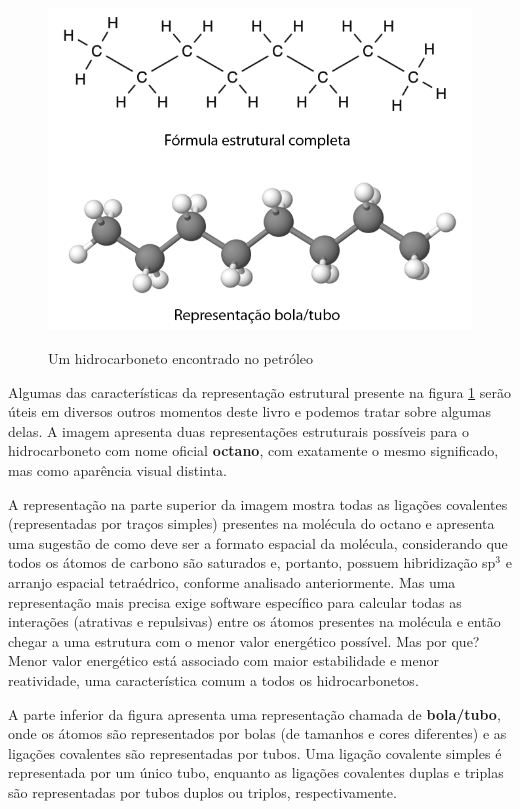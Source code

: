 \documentclass[a4paper,12pt]{book}
\begin{document}
\begin{figure}[H]\centering
\caption{Um hidrocarboneto encontrado no petróleo}
\includegraphics[scale=0.5]{imagens/octano.png}
\label{fig:ocatene}\vspace{0.5cm}\end{figure}

Algumas das características da representação estrutural presente na figura \ref{fig:ocatene} serão úteis em diversos outros momentos deste livro e podemos tratar sobre algumas delas. A imagem apresenta duas representações estruturais possíveis para o hidrocarboneto com nome oficial \textbf{octano}, com exatamente o mesmo significado, mas como aparência visual distinta. 

A representação na parte superior da imagem mostra todas as ligações covalentes (representadas por traços simples) presentes na molécula do octano e apresenta uma sugestão de como deve ser a formato espacial da molécula, considerando que todos os átomos de carbono são saturados e, portanto, possuem hibridização sp$^3$ e arranjo espacial tetraédrico, conforme analisado anteriormente. Mas uma representação mais precisa exige software específico para calcular todas as interações (atrativas e repulsivas) entre os átomos presentes na molécula e então chegar a uma estrutura com o menor valor energético possível. Mas por que? Menor valor energético está associado com maior estabilidade e menor reatividade, uma característica comum a todos os hidrocarbonetos.

A parte inferior da figura apresenta uma representação chamada de \textbf{bola/tubo}, onde os átomos são representados por bolas (de tamanhos e cores diferentes) e as ligações covalentes são representadas por tubos. Uma ligação covalente simples é representada por um único tubo, enquanto as ligações covalentes duplas e triplas são representadas por tubos duplos ou triplos, respectivamente.
\end{document}
